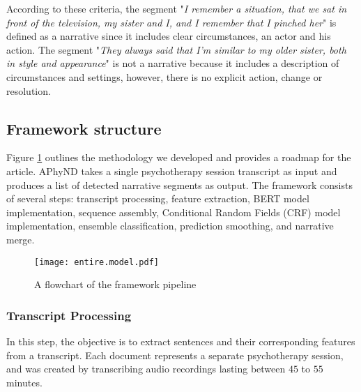 \documentclass[preprint,12pt]{elsarticle}
\begin{document}
According to these criteria, the segment "\emph{I remember a situation, that we sat in front of the television, my sister and I, and I remember that I pinched her}" is defined as a narrative since it includes clear circumstances, an actor and his action. The segment "\emph{They always said that I'm similar to my older sister, both in style and appearance}" is not a narrative because it includes a description of circumstances and settings, however, there is no explicit action, change or resolution.


\subsection{Framework structure}

Figure \ref{fig:framework.pipeline} outlines the methodology we developed and provides a roadmap for the article. APhyND takes a single psychotherapy session transcript as input and produces a list of detected narrative segments as output. The framework consists of several steps: transcript processing, feature extraction, BERT \cite{devlin2018bert} model implementation, sequence assembly, Conditional Random Fields (CRF)  \cite{lafferty2001conditional} model implementation, ensemble classification, prediction smoothing, and narrative merge.

\begin{figure}[ht]
  \centering
  \texttt{[image: entire.model.pdf]}
  \caption{A flowchart of the framework pipeline}
   \label{fig:framework.pipeline}
\end{figure}


\subsubsection{Transcript Processing}

In this step, the objective is to extract sentences and their corresponding features from a transcript. Each document represents a separate psychotherapy session, and was created by transcribing audio recordings lasting between $45$ to $55$ minutes.
\end{document}
